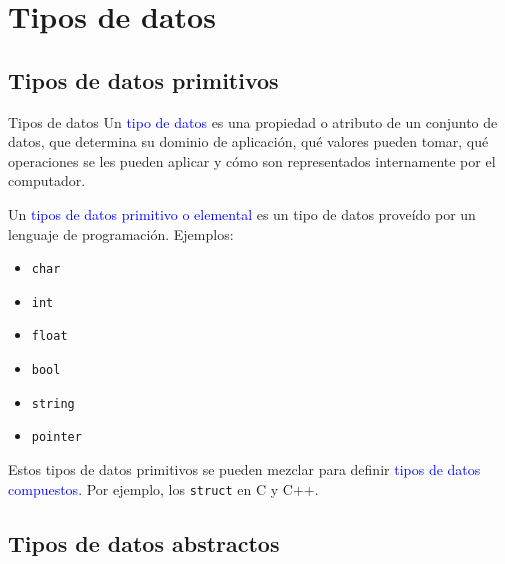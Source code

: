 \documentclass{beamer} %
\newcommand{\blue}[1]{\textcolor{blue}{#1}}
\begin{document}

\section{Tipos de datos}

\subsection{Tipos de datos primitivos}

\begin{frame}{Tipos de datos}
    Un \blue{tipo de datos} es una propiedad o atributo de un conjunto de datos, que determina su dominio de aplicación, qué valores pueden tomar, qué operaciones se les pueden aplicar y cómo son representados internamente por el computador.
    \medskip\pause

    Un \blue{tipos de datos primitivo o elemental} es un tipo de datos proveído por un lenguaje de programación. Ejemplos:
    \pause

      \begin{multicols}{2}
      \begin{itemize}
        \item<3-> \texttt{char}
        \item<3-> \texttt{int}
        \item<3-> \texttt{float}
        \item<3-> \texttt{bool}
        \item<3-> \texttt{string}
        \item<3-> \texttt{pointer}
      \end{itemize}
      \end{multicols}
    \pause
    Estos tipos de datos primitivos se pueden mezclar para definir \blue{tipos de datos compuestos}. Por ejemplo, los \texttt{struct} en C y C++.
\end{frame}

\subsection{Tipos de datos abstractos}
\end{document}
